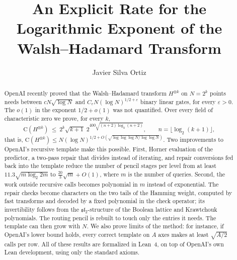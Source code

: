 \documentclass[acmsmall,nonacm,screen]{acmart}
\newcommand{\cost}{\mathrm{C}}
\begin{document}
\title{An Explicit Rate for the Logarithmic Exponent of the Walsh--Hadamard Transform}

\author{Javier Silva Ortiz}

\begin{abstract}
OpenAI recently proved that the Walsh--Hadamard transform $H^{\otimes k}$ on $N=2^k$ points needs between $cN\sqrt{\log N}$ and $C_\varepsilon N(\log N)^{1/2+\varepsilon}$ binary linear gates, for every $\varepsilon>0$. The $o(1)$ in the exponent $1/2+o(1)$ was not quantified. Over every field of characteristic zero we prove, for every $k$,
\[
  \cost(H^{\otimes k})\ \le\ 2^k\sqrt{k+1}\;2^{400\sqrt{(n+2)\log_2(n+2)}},\qquad n=\lfloor\log_2(k+1)\rfloor,
\]
that is, $\cost(H^{\otimes k})\le N(\log N)^{1/2+O(\sqrt{\log\log\log N/\log\log N})}$. Two improvements to OpenAI's recursive template make this possible. First, Horner evaluation of the predictor, a two-pass repair that divides instead of iterating, and repair conversions fed back into the template reduce the number of pencil stages per level from at least $11.3\sqrt{m\log_2 2m}$ to $\frac{20}{3}\sqrt m+O(1)$, where $m$ is the number of queries. Second, the work outside recursive calls becomes polynomial in $m$ instead of exponential. The repair checks become characters on the two tails of the Hamming weight, computed by fast transforms and decoded by a fixed polynomial in the check operator; its invertibility follows from the $\mathfrak{sl}_2$-structure of the Boolean lattice and Krawtchouk polynomials. The routing pencil is rebuilt to touch only the entries it needs. The template can then grow with $N$. We also prove limits of the method: for instance, if OpenAI's lower bound holds, every correct template on $A$ axes makes at least $\sqrt{A/2}$ calls per row. All of these results are formalized in Lean~4, on top of OpenAI's own Lean development, using only the standard axioms.
\end{abstract}


\maketitle

\end{document}
